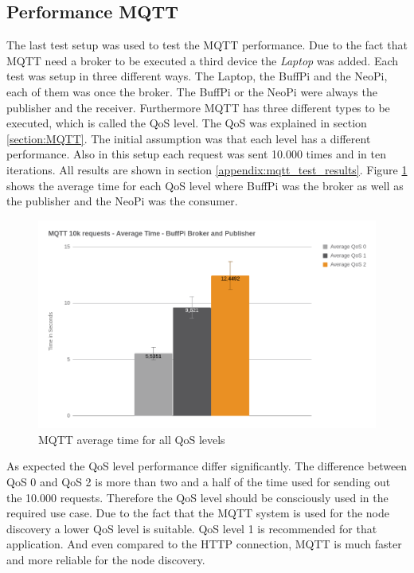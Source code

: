 \subsection{Performance MQTT}
The last test setup was used to test the MQTT performance.
Due to the fact that MQTT need a broker to be executed a third device the \textit{Laptop} was added.
Each test was setup in three different ways.
The Laptop, the BuffPi and the NeoPi, each of them was once the broker.
The BuffPi or the NeoPi were always the publisher and the receiver.
Furthermore MQTT has three different types to be executed, which is called the \ac{QoS} level.
The \ac{QoS} was explained in section \ref{section:MQTT}.
The initial assumption was that each level has a different performance.
Also in this setup each request was sent 10.000 times and in ten iterations.
All results are shown in section \ref{appendix:mqtt_test_results}.
Figure \ref{fig:performance_mqtt_average_time_all_qos} shows the average time for each \ac{QoS} level where BuffPi was the broker as well as the publisher and the NeoPi was the consumer.

\begin{figure}[H]
    \centering
    \includegraphics[width=\textwidth]{resources/images/performance_mqtt_average_time.png}
    \caption[MQTT average time for all QoS levels]{MQTT average time for all QoS levels}
    \label{fig:performance_mqtt_average_time_all_qos}
\end{figure}

As expected the \ac{QoS} level performance differ significantly.
The difference between \ac{QoS} 0 and \ac{QoS} 2 is more than two and a half of the time used for sending out the 10.000 requests.
Therefore the \ac{QoS} level should be consciously used in the required use case.
Due to the fact that the MQTT system is used for the node discovery a lower \ac{QoS} level is suitable.
\ac{QoS} level 1 is recommended for that application.
And even compared to the \ac{HTTP} connection, MQTT is much faster and more reliable for the node discovery.\newline

